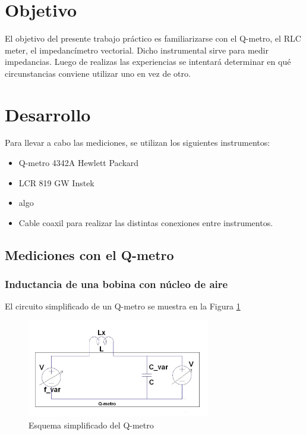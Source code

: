 \documentclass[a4paper,10pt]{article}
\title{  }
\begin{document}
	\maketitle %
	\newpage

	\tableofcontents %
	\newpage


	\section{Objetivo}
	
	\indent	El objetivo del presente trabajo práctico es familiarizarse con 
	el Q-metro, el RLC meter, el impedancímetro vectorial. Dicho instrumental
	sirve para medir impedancias. Luego de realizas las experiencias se 
	intentará determinar en qué circunstancias conviene utilizar uno en vez 
	de otro.

	\newpage
	\section{Desarrollo}
	
	\indent Para llevar a cabo las mediciones, se utilizan los siguientes 
	instrumentos:
		\begin{itemize}
			\item Q-metro 4342A Hewlett Packard
			\item LCR 819 GW Instek
			\item algo
			\item Cable coaxil para realizar las distintas conexiones entre 
			instrumentos.
		\end{itemize}	
	
		\subsection{Mediciones con el Q-metro}
		\subsubsection{Inductancia de una bobina con n\'ucleo de aire}
		
		\indent El circuito simplificado de un Q-metro se muestra en la Figura
		\ref{img001}

			\begin{figure}[!htb]
				\centering
				\includegraphics[width=8cm]
				{Imagenes/qmetro.png}
				\caption{Esquema simplificado del Q-metro}
				\label{img001} 
			\end{figure}
\end{document}
